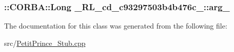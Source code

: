 \subsubsection[{\texorpdfstring{arg\+\_\+1}{arg_1}}]{\setlength{\rightskip}{0pt plus 5cm}\+::C\+O\+R\+B\+A\+::\+Long \+\_\+R\+L\+\_\+cd\+\_\+c93297503b4b476c\+\_\+::arg\+\_}\hypertarget{class__0_r_l__cd__c93297503b4b476c__91000000_a48914b58e05510223789862d5cbd7ec3}{}\label{class__0_r_l__cd__c93297503b4b476c__91000000_a48914b58e05510223789862d5cbd7ec3}


The documentation for this class was generated from the following file\+:\begin{DoxyCompactItemize}
\item 
src/\hyperlink{_petit_prince___stub_8cpp}{Petit\+Prince\+\_\+\+Stub.\+cpp}\end{DoxyCompactItemize}
